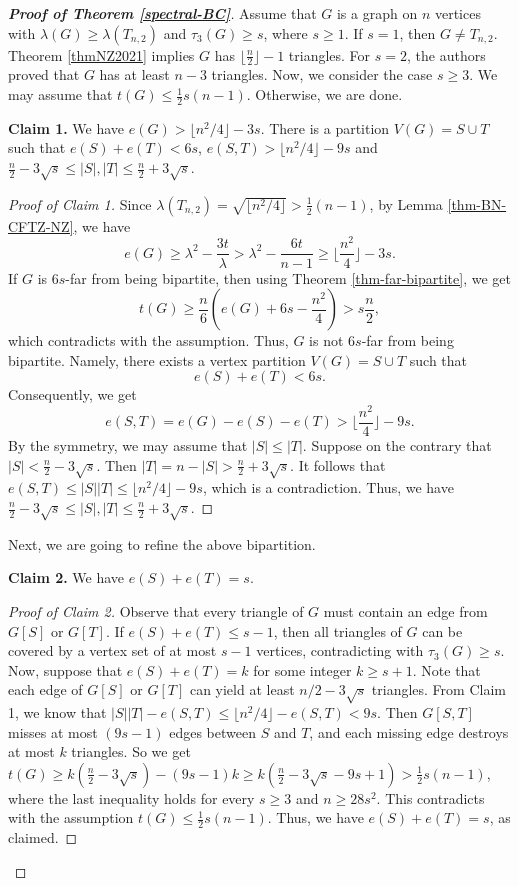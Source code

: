 \documentclass[11pt]{article}
\begin{document}
\begin{proof}[{\bf Proof of Theorem \ref{spectral-BC}}]
Assume that $G$ is a graph on $n$ vertices with
 $\lambda (G)\ge \lambda (T_{n,2})$ and $\tau_3(G)\ge s$, 
 where $s\ge 1$.  If $s=1$, then 
 $G\neq T_{n,2}$. Theorem \ref{thmNZ2021} implies $G$ has 
 $\lfloor \frac{n}{2} \rfloor -1$ triangles. 
 For $s=2$, the authors \cite{LFP-count-bowtie} proved that $G$ has at least $n-3$ triangles. 
Now, we consider the case $s\ge 3$. 
We may assume that $t(G)\le \frac{1}{2} s{(n-1)}$. 
 Otherwise, we are done. 
 
 \medskip 
\noindent 
{\bf Claim 1.} 
We have $e(G)> \lfloor n^2/4\rfloor -3s$. 
There is a partition $V(G) =S\cup T$ such that 
$e(S) + e(T)< 6s$, $e(S,T)>\lfloor n^2/4\rfloor -9s$ and 
$ \frac{n}{2} - 3\sqrt{s} \le |S|, |T| \le \frac{n}{2} +3\sqrt{s}$. 

\begin{proof}[Proof of Claim 1]
 Since $\lambda (T_{n,2}) = \sqrt{\lfloor n^2/4\rfloor} 
 > \frac{1}{2} (n-1)$, by 
 Lemma \ref{thm-BN-CFTZ-NZ}, we have 
\[   e(G)\ge \lambda^2- \frac{3t}{\lambda} 
>  \lambda^2 - \frac{6t}{n-1} \ge   
\Big\lfloor \frac{n^2}{4} \Big\rfloor -3s . \]  
If $G$ is $6s$-far from being bipartite, 
then using Theorem \ref{thm-far-bipartite}, we get 
\[ t(G)\ge \frac{n}{6} 
\left(e(G) + 6s - \frac{n^2}{4} \right) > s\frac{n}{2}, \]  
which contradicts with the assumption.  
 Thus, $G$ is not $6s$-far from being bipartite. 
Namely, there exists a vertex partition 
$V(G)=S\cup T$ such that 
\[ e(S) + e(T)< 6s. \]  
Consequently, we get 
\[  e(S,T) = e(G) - e(S) - e(T) > \Big\lfloor \frac{n^2}{4} \Big\rfloor - 9s. \]  
By the symmetry, we may assume that $|S|\le |T|$. 
Suppose on the contrary that $|S|< \frac{n}{2} - 3\sqrt{s}$. 
Then $|T| = n-|S| > \frac{n}{2} +3\sqrt{s} $. 
It follows that $e(S,T) \le |S||T| \le  \lfloor n^2/4\rfloor -9s$, 
which is a contradiction. Thus, we have 
$ \frac{n}{2} - 3\sqrt{s} \le |S|, |T| \le \frac{n}{2} +3\sqrt{s}$.   
\end{proof}


Next, we are going to refine the above bipartition. 

\medskip 
\noindent 
{\bf Claim 2.} We have $e(S) + e(T)=s$. 

\begin{proof}[Proof of Claim 2]
Observe that every triangle of $G$ must contain an edge from $G[S]$ or $G[T]$. If $e(S) + e(T)\le s-1$, then 
all triangles of $G$ can be covered by a vertex set of 
at most $s-1$ vertices, contradicting with $\tau_3(G)\ge s$. 
Now, suppose that $e(S) + e(T)=k$ for some integer $k\ge s+1$.  Note that  
each edge of $G[S]$ or $G[T]$ can yield 
at least ${n}/{2} -3\sqrt{s}$ triangles. 
From Claim 1, we know that  $|S||T| - e(S,T)\le \lfloor n^2/4\rfloor - e(S,T)<9s$. Then 
$G[S,T]$ misses at most $(9s -1)$ edges between 
$S$ and $T$,  and each missing edge  destroys at most $k$ triangles. 
So we get $t(G)\ge k(\frac{n}{2} -3\sqrt{s}) - (9s-1)k \ge k (\frac{n}{2} - 3\sqrt{s} -9s+1) > \frac{1}{2}s(n-1)$, 
where the last inequality holds for every $s\ge 3$ and $n\ge 28s^2$. 
This contradicts with the assumption $t(G)\le \frac{1}{2}s(n-1)$. 
Thus, we have $e(S) + e(T)=s$, as claimed. 
\end{proof}


\end{proof}
\end{document}
